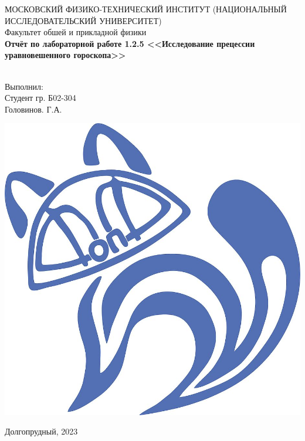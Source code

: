 

\begin{titlepage}
	\begin{center}
		МОСКОВСКИЙ ФИЗИКО-ТЕХНИЧЕСКИЙ ИНСТИТУТ (НАЦИОНАЛЬНЫЙ ИССЛЕДОВАТЕЛЬСКИЙ УНИВЕРСИТЕТ) \\
		
		
		\hfill \break
		Факультет обшей и прикладной физики\\
		\vspace{2.5cm}
		\large{\textbf{Отчёт по лабораторной работе 1.2.5 <<Исследование прецессии уравновешенного гороскопа>>}}\\
		\hfill \break
		\\
	\end{center}
	
	\begin{flushright}
		Выполнил:\\
		Студент гр. Б02-304\\
		Головинов. Г.А.
	\end{flushright}
	
	\vspace{7cm}
	
	\begin{center}
		\includegraphics[width=0.15\linewidth]{uni}
	\end{center}
	

	

	\vfill
	
	\begin{center} Долгопрудный, 2023 \end{center}
	
	\thispagestyle{empty}
	
\end{titlepage}

